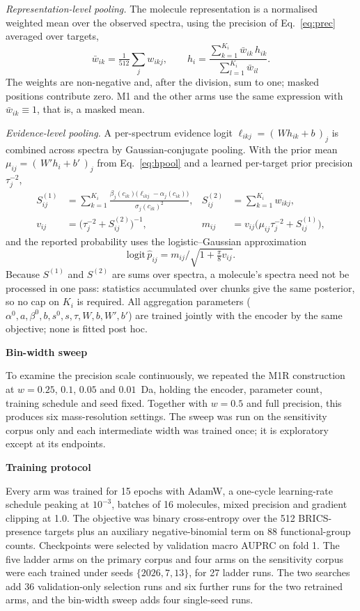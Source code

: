 \documentclass[11pt]{article}
\newcommand{\hd}[1]{\medskip\par\noindent\textbf{#1}\par\nobreak\vspace{2pt}\noindent\ignorespaces}
\begin{document}
\emph{Representation-level pooling.} The molecule representation is a normalised weighted mean over the observed spectra, using the precision of Eq.~\eqref{eq:prec} averaged over targets,
\begin{equation}
\bar w_{ik} = \tfrac{1}{512}\textstyle\sum_j w_{ikj}, \qquad
h_i = \frac{\sum_{k=1}^{K_i} \bar w_{ik}\, h_{ik}}{\sum_{l=1}^{K_i} \bar w_{il}} .
\label{eq:hpool}
\end{equation}
The weights are non-negative and, after the division, sum to one; masked positions contribute zero. M1 and the other arms use the same expression with $\bar w_{ik}\equiv 1$, that is, a masked mean.

\emph{Evidence-level pooling.} A per-spectrum evidence logit $\ell_{ikj}=(\,W h_{ik} + b\,)_j$ is combined across spectra by Gaussian-conjugate pooling. With the prior mean $\mu_{ij} = (\,W' h_i + b'\,)_j$ from Eq.~\eqref{eq:hpool} and a learned per-target prior precision $\tau_j^{-2}$,
\begin{align}
S^{(1)}_{ij} &= \sum_{k=1}^{K_i} \frac{\beta_j(c_{ik})\bigl(\ell_{ikj}-\alpha_j(c_{ik})\bigr)}{\sigma_j(c_{ik})^2}, &
S^{(2)}_{ij} &= \sum_{k=1}^{K_i} w_{ikj}, \\
v_{ij} &= \bigl(\tau_j^{-2} + S^{(2)}_{ij}\bigr)^{-1}, &
m_{ij} &= v_{ij}\bigl(\mu_{ij}\tau_j^{-2} + S^{(1)}_{ij}\bigr),
\end{align}
and the reported probability uses the logistic--Gaussian approximation
\begin{equation}
\mathrm{logit}\,\hat p_{ij} = m_{ij}\big/\sqrt{1 + \tfrac{\pi}{8} v_{ij}}.
\end{equation}
Because $S^{(1)}$ and $S^{(2)}$ are sums over spectra, a molecule's spectra need not be processed in one pass: statistics accumulated over chunks give the same posterior, so no cap on $K_i$ is required. All aggregation parameters ($\alpha^0,a,\beta^0,b,s^0,s,\tau,W,b,W',b'$) are trained jointly with the encoder by the same objective; none is fitted post hoc.

\hd{Bin-width sweep}
To examine the precision scale continuously, we repeated the M1R construction at $w=0.25$, $0.1$, $0.05$ and $0.01$~Da, holding the encoder, parameter count, training schedule and seed fixed. Together with $w=0.5$ and full precision, this produces six mass-resolution settings. The sweep was run on the sensitivity corpus only and each intermediate width was trained once; it is exploratory except at its endpoints.

\hd{Training protocol}
Every arm was trained for 15 epochs with AdamW, a one-cycle learning-rate schedule peaking at $10^{-3}$, batches of 16 molecules, mixed precision and gradient clipping at 1.0. The objective was binary cross-entropy over the 512 BRICS-presence targets plus an auxiliary negative-binomial term on 88 functional-group counts. Checkpoints were selected by validation macro AUPRC on fold 1. The five ladder arms on the primary corpus and four arms on the sensitivity corpus were each trained under seeds $\{2026,7,13\}$, for 27 ladder runs. The two searches add 36 validation-only selection runs and six further runs for the two retrained arms, and the bin-width sweep adds four single-seed runs.
\end{document}
